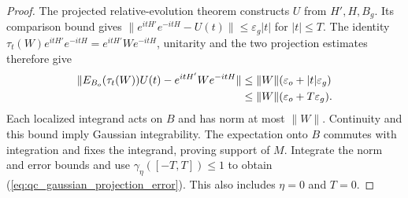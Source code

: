 \begin{proof}\leanok
    The projected relative-evolution theorem constructs $U$ from $H',H,B_g$.
    Its comparison bound gives
    $\|e^{itH'}e^{-itH}-U(t)\|\le\varepsilon_g|t|$ for $|t|\le T$.
    The identity
    $\tau_t(W)e^{itH'}e^{-itH}=e^{itH'}We^{-itH}$, unitarity and the two
    projection estimates therefore give
    \begin{align}
        \|E_{B_o}(\tau_t(W))U(t)-e^{itH'}We^{-itH}\|
         & \le\|W\|(\varepsilon_o+|t|\varepsilon_g)\notag \\
         & \le\|W\|(\varepsilon_o+T\varepsilon_g).\notag
    \end{align}
    Each localized integrand acts on $B$ and has norm at most $\|W\|$.
    Continuity and this bound imply Gaussian integrability. The expectation
    onto $B$ commutes with integration and fixes the integrand, proving
    support of $M$. Integrate the norm and error bounds and use
    $\gamma_\eta([-T,T])\le1$ to obtain
    (\ref{eq:qc_gaussian_projection_error}). This also includes $\eta=0$ and $T=0$.
\end{proof}
